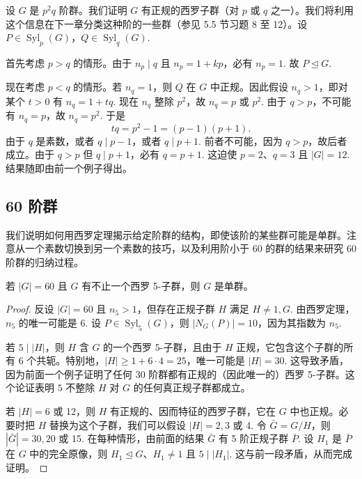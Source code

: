 \begin{example}[\(p^2 q\) 阶群，\(p, q\) 是不同素数]
设 \(G\) 是 \(p^2 q\) 阶群。我们证明 \(G\) 有正规的西罗子群（对 \(p\) 或 \(q\) 之一）。我们将利用这个信息在下一章分类这种阶的一些群（参见 5.5 节习题 8 至 12）。设 \(P \in \operatorname{Syl}_p(G)\)，\(Q \in \operatorname{Syl}_q(G)\).

首先考虑 \(p > q\) 的情形。由于 \(n_p \mid q\) 且 \(n_p = 1 + kp\)，必有 \(n_p = 1\). 故 \(P \trianglelefteq G\).

现在考虑 \(p < q\) 的情形。若 \(n_q = 1\)，则 \(Q\) 在 \(G\) 中正规。因此假设 \(n_q > 1\)，即对某个 \(t > 0\) 有 \(n_q = 1 + tq\). 现在 \(n_q\) 整除 \(p^2\)，故 \(n_q = p\) 或 \(p^2\). 由于 \(q > p\)，不可能有 \(n_q = p\)，故 \(n_q = p^2\). 于是
\[
tq = p^2 - 1 = (p-1)(p+1).
\]
由于 \(q\) 是素数，或者 \(q \mid p-1\)，或者 \(q \mid p+1\). 前者不可能，因为 \(q > p\)，故后者成立。由于 \(q > p\) 但 \(q \mid p+1\)，必有 \(q = p + 1\). 这迫使 \(p = 2\)、\(q = 3\) 且 \(|G| = 12\). 结果随即由前一个例子得出。
\end{example}

\subsection*{60 阶群}

我们说明如何用西罗定理揭示给定阶群的结构，即使该阶的某些群可能是单群。注意从一个素数切换到另一个素数的技巧，以及利用阶小于 60 的群的结果来研究 60 阶群的归纳过程。

\begin{proposition}\label{pro:4.21}
若 \(|G| = 60\) 且 \(G\) 有不止一个西罗 5-子群，则 \(G\) 是单群。
\end{proposition}

\begin{proof}
反设 \(|G| = 60\) 且 \(n_5 > 1\)，但存在正规子群 \(H\) 满足 \(H \neq 1, G\). 由西罗定理，\(n_5\) 的唯一可能是 6. 设 \(P \in \operatorname{Syl}_5(G)\)，则 \(|N_G(P)| = 10\)，因为其指数为 \(n_5\).

若 \(5 \mid |H|\)，则 \(H\) 含 \(G\) 的一个西罗 5-子群，且由于 \(H\) 正规，它包含这个子群的所有 6 个共轭。特别地，\(|H| \geq 1 + 6 \cdot 4 = 25\)，唯一可能是 \(|H| = 30\). 这导致矛盾，因为前面一个例子证明了任何 30 阶群都有正规的（因此唯一的）西罗 5-子群。这个论证表明 \(5\) 不整除 \(H\) 对 \(G\) 的任何真正规子群都成立。

若 \(|H| = 6\) 或 12，则 \(H\) 有正规的、因而特征的西罗子群，它在 \(G\) 中也正规。必要时把 \(H\) 替换为这个子群，我们可以假设 \(|H| = 2, 3\) 或 4. 令 \(\bar{G} = G/H\)，则 \(|\bar{G}| = 30, 20\) 或 15. 在每种情形，由前面的结果 \(\bar{G}\) 有 5 阶正规子群 \(\bar{P}\). 设 \(H_1\) 是 \(\bar{P}\) 在 \(G\) 中的完全原像，则 \(H_1 \trianglelefteq G\)、\(H_1 \neq 1\) 且 \(5 \mid |H_1|\). 这与前一段矛盾，从而完成证明。
\end{proof}

